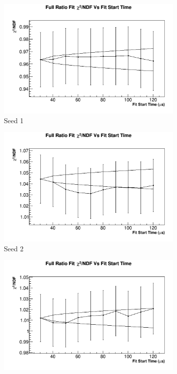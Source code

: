		\begin{figure}[]
		\centering
		    \begin{subfigure}[t]{0.45\textwidth}
			    \centering
				\includegraphics[width=\textwidth]{RatioCBO_Chi2NDF_Vs_FS_canv-Seed0}
			    \caption{Seed 1}
		    \end{subfigure}
		    \begin{subfigure}[t]{0.45\textwidth}
			    \centering
				\includegraphics[width=\textwidth]{RatioCBO_Chi2NDF_Vs_FS_canv-Seed1}
			    \caption{Seed 2}
		    \end{subfigure}%
		    \vspace{4mm}
		    \begin{subfigure}[t]{0.45\textwidth}
			    \centering
				\includegraphics[width=\textwidth]{RatioCBO_Chi2NDF_Vs_FS_canv-Seed2}

\end{subfigure}
\end{figure}
